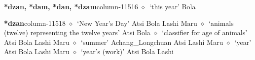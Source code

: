   \item {\footnotesize \textbf{*dzan, *dam, *dan, *dzam}}{\tiny column-11516}
         $\diamond$~`this year'
         Bola 
  \item {\footnotesize \textbf{*dzan}}{\tiny column-11518}
         $\diamond$~`New Year's Day'
         Atsi 
\hspace{1ex}
         Bola 
\hspace{1ex}
         Lashi 
\hspace{1ex}
         Maru 
\hspace{1ex}
         $\diamond$~`animals (twelve) representing the twelve years'
         Atsi 
\hspace{1ex}
         Bola 
\hspace{1ex}
         $\diamond$~`classifier for age of animals'
         Atsi 
\hspace{1ex}
         Bola 
\hspace{1ex}
         Lashi 
\hspace{1ex}
         Maru 
\hspace{1ex}
         $\diamond$~`summer'
         Achang\_Longchuan 
\hspace{1ex}
         Atsi 
\hspace{1ex}
         Lashi 
\hspace{1ex}
         Maru 
\hspace{1ex}
         $\diamond$~`year'
         Atsi 
\hspace{1ex}
         Bola 
\hspace{1ex}
         Lashi 
\hspace{1ex}
         Maru 
\hspace{1ex}
         $\diamond$~`year's (work)'
         Atsi 
\hspace{1ex}
         Bola 
\hspace{1ex}
         Lashi 

